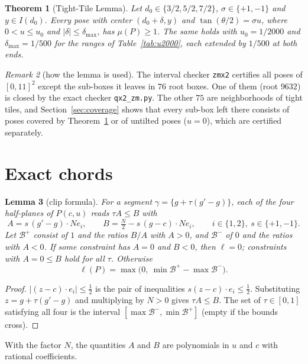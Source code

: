 \documentclass[11pt]{amsart}
\newtheorem{theorem}{Theorem}[section]
\newtheorem{lemma}[theorem]{Lemma}
\theoremstyle{definition}
\theoremstyle{remark}
\newtheorem{remark}[theorem]{Remark}
\begin{document}
\begin{theorem}[Tight-Tile Lemma]\label{thm:tt}
Let $d_0\in\{3/2,5/2,7/2\}$, $\sigma\in\{+1,-1\}$ and $y\in I(d_0)$. Every pose with center $(d_0+\delta,y)$ and
$\tan(\theta/2)=\sigma u$, where $0<u\le u_0$ and $|\delta|\le\delta_{\max}$, has $\mu(P)\ge1$. The same holds with
$u_0=1/2000$ and $\delta_{\max}=1/500$ for the ranges of Table~\ref{tab:u2000}, each extended by $1/500$ at both
ends.
\end{theorem}

\begin{remark}[how the lemma is used]
The interval checker \texttt{zmx2} certifies all poses of $[0,11]^2$ except the sub-boxes it leaves in $76$ root
boxes. One of them (root $9632$) is closed by the exact checker \texttt{qx2\_zm.py}. The other $75$ are neighborhoods of
tight tiles, and Section~\ref{sec:coverage} shows that every sub-box left there consists of poses covered by
Theorem~\ref{thm:tt} or of untilted poses ($u=0$), which are certified separately.
\end{remark}

\section{Exact chords}\label{sec:chords}

\begin{lemma}[clip formula]\label{lem:clip}
For a segment $\gamma=\{g+\tau(g'-g)\}$, each of the four half-planes of $P(c,u)$ reads $\tau A\le B$ with
\[
A=s\,(g'-g)\cdot Ne_i,\qquad B=\tfrac N2-s\,(g-c)\cdot Ne_i,\qquad i\in\{1,2\},\ s\in\{+1,-1\}.
\]
Let $\mathcal B^+$ consist of $1$ and the ratios $B/A$ with $A>0$, and $\mathcal B^-$ of $0$ and the ratios with
$A<0$. If some constraint has $A=0$ and $B<0$, then $\ell=0$; constraints with $A=0\le B$ hold for all $\tau$. Otherwise
\[
\ell(P)=\max\bigl(0,\ \min\mathcal B^+-\max\mathcal B^-\bigr).
\]
\end{lemma}

\begin{proof}
$|(z-c)\cdot e_i|\le\frac12$ is the pair of inequalities $s(z-c)\cdot e_i\le\frac12$. Substituting
$z=g+\tau(g'-g)$ and multiplying by $N>0$ gives $\tau A\le B$. The set of $\tau\in[0,1]$ satisfying all four is the
interval $[\max\mathcal B^-,\min\mathcal B^+]$ (empty if the bounds cross).
\end{proof}

With the factor $N$, the quantities $A$ and $B$ are polynomials in $u$ and $c$ with rational coefficients.
\end{document}
